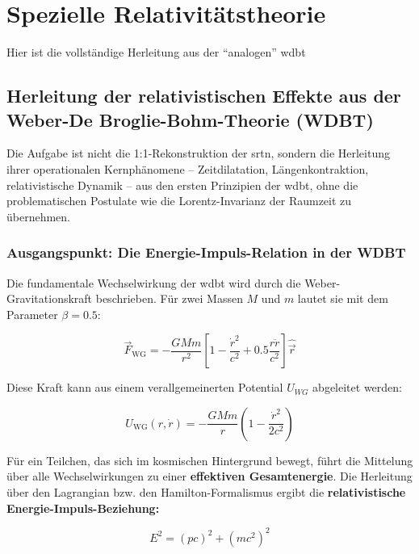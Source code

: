 \chapter{Spezielle Relativitätstheorie}
Hier ist die vollständige Herleitung aus der \enquote{analogen} \gls{wdbt}

\section{Herleitung der relativistischen Effekte aus der Weber-De Broglie-Bohm-Theorie (WDBT)}
Die Aufgabe ist nicht die 1:1-Rekonstruktion der \gls{srtn}, sondern die Herleitung ihrer operationalen Kernphänomene – Zeitdilatation, Längenkontraktion, relativistische Dynamik – aus den ersten
Prinzipien der \gls{wdbt}, ohne die problematischen Postulate wie die Lorentz-Invarianz der Raumzeit zu übernehmen.

\subsection{Ausgangspunkt: Die Energie-Impuls-Relation in der WDBT}
Die fundamentale Wechselwirkung der \gls{wdbt} wird durch die Weber-Gravitationskraft beschrieben. Für zwei Massen $M$ und $m$ lautet sie mit dem Parameter $\beta = 0.5$:

\begin{equation}
    \label{eq:weber_g}
    \vec{F}_{\text{WG}} = -\frac{G M m}{r^2} \left[ 1 - \frac{\dot{r}^2}{c^2} + 0.5 \frac{r \ddot{r}}{c^2} \right] \hat{\vec{r}}
\end{equation}

Diese Kraft kann aus einem verallgemeinerten Potential $U_{WG}$ abgeleitet werden:

\begin{equation}
    \label{eq:potential}
    U_{\text{WG}}(r, \dot{r}) = -\frac{G M m}{r} \left( 1 - \frac{\dot{r}^2}{2c^2} \right)
\end{equation}

Für ein Teilchen, das sich im kosmischen Hintergrund bewegt, führt die Mittelung über alle Wechselwirkungen zu einer \textbf{effektiven Gesamtenergie}. Die Herleitung über den Lagrangian bzw. den
Hamilton-Formalismus ergibt die \textbf{relativistische Energie-Impuls-Beziehung:}

\begin{equation}
    \label{eq:energie_impuls_beziehung}
    \boxed
    {
        E^2 = (p c)^2 + (m c^2)^2
    }
\end{equation}

